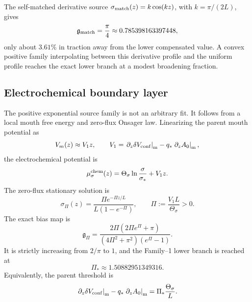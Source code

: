 The self-matched derivative source \(\sigma_{\rm match}(z)=k\cos(kz)\), with \(k=\pi/(2L)\), gives
\begin{equation}
\label{eq:app-part04-g-match}
\mathfrak g_{\rm match}=\frac{\pi}{4}\approx0.785398163397448,
\end{equation}
only about \(3.61\%\) in traction away from the lower compensated value.  A convex positive family interpolating between this derivative profile and the uniform profile reaches the exact lower branch at a modest broadening fraction.

\subsection{Electrochemical boundary layer}
\label{subsec:app-part04-electrochemical-boundary-layer}

The positive exponential source family is not an arbitrary fit.  It follows from a local mouth free energy and zero-flux Onsager law.  Linearizing the parent mouth potential as
\begin{equation}
\label{eq:app-part04-V1-def}
V_m(z)\approx V_1z,
\qquad
V_1=\left.\partial_z\delta V_{\rm conf}\right|_{\rm m}-q_*\left.\partial_zA_0\right|_{\rm m},
\end{equation}
the electrochemical potential is
\begin{equation}
\mu_\sigma^{\rm chem}(z)=\Theta_\sigma\ln\frac{\sigma}{\sigma_*}+V_1z.
\end{equation}
The zero-flux stationary solution is
\begin{equation}
\label{eq:app-part04-sigmaPi}
\sigma_\Pi(z)
=
\frac{\Pi e^{-\Pi z/L}}{L(1-e^{-\Pi})},
\qquad
\Pi:=\frac{V_1L}{\Theta_\sigma}>0.
\end{equation}
The exact bias map is
\begin{equation}
\label{eq:app-part04-gPi}
\mathfrak g_\Pi
=
\frac{2\Pi(2\Pi e^\Pi+\pi)}{(4\Pi^2+\pi^2)(e^\Pi-1)}.
\end{equation}
It is strictly increasing from \(2/\pi\) to \(1\), and the Family--1 lower branch is reached at
\begin{equation}
\label{eq:app-part04-Pi-star}
\Pi_*\approx1.50882951349316.
\end{equation}
Equivalently, the parent threshold is
\begin{equation}
\label{eq:app-part04-parent-mouth-threshold}
\left.\partial_z\delta V_{\rm conf}\right|_{\rm m}
-q_*\left.\partial_zA_0\right|_{\rm m}
=
\Pi_*\frac{\Theta_\sigma}{L}.
\end{equation}

